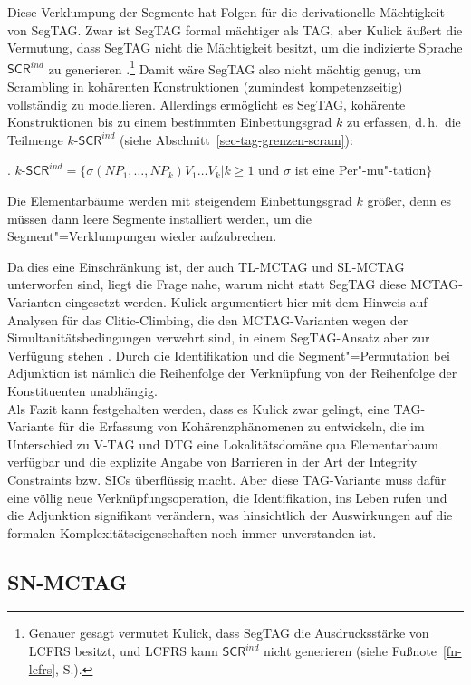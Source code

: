 Diese Verklumpung der Segmente hat Folgen für die derivationelle Mächtigkeit von SegTAG. Zwar ist SegTAG formal mächtiger als TAG, aber Kulick äu\ss ert die Vermutung, dass SegTAG nicht die Mächtigkeit besitzt, um die indizierte Sprache $\mathsf{SCR}^{ind}$ zu generieren \cite[215]{Kulick:00}.\footnote{Genauer gesagt vermutet Kulick, dass SegTAG die Ausdrucksstärke von LCFRS besitzt, und LCFRS kann $\mathsf{SCR}^{ind}$ nicht generieren (siehe Fußnote~\ref{fn-lcfrs}, S.\pageref{fn-lcfrs}).} Damit wäre SegTAG also nicht mächtig genug, um Scrambling in kohärenten Konstruktionen (zumindest kompetenzseitig) vollständig zu modellieren. Allerdings ermöglicht es SegTAG, kohärente Konstruktionen bis zu einem bestimmten Einbettungsgrad $k$ zu erfassen, d.\,h.\ die Teilmenge $k$-$\mathsf{SCR}^{ind}$ (siehe Abschnitt~\ref{sec-tag-grenzen-scram}):

\ex. $k$-$\mathsf{SCR}^{ind} = \{ \sigma(\mathit{NP}_1,\ldots,\mathit{NP}_k) V_1 \ldots V_k | k \geq 1$ und $\sigma$ ist eine Per"-mu"-tation$\}$

Die Elementarbäume werden mit steigendem Einbettungsgrad $k$ grö\ss er, denn es müssen dann leere Segmente installiert werden, um die Segment"=Verklumpungen wieder aufzubrechen. 

Da dies eine Einschränkung ist, der auch TL-MCTAG und SL-MCTAG unterworfen sind, liegt die Frage nahe, warum nicht statt SegTAG diese MCTAG-Varianten eingesetzt werden. Kulick argumentiert hier mit dem Hinweis auf Analysen für das Clitic-Climbing, die den MCTAG-Varianten wegen der Simultanitätsbedingungen verwehrt sind, in einem SegTAG-Ansatz aber zur Verfügung stehen \cite[53ff]{Kulick:00}. Durch die Identifikation und die Segment"=Permutation bei Adjunktion ist nämlich die Reihenfolge der Verknüpfung von der Reihenfolge der Konstituenten unabhängig.  \\     

Als Fazit kann festgehalten werden, dass es Kulick zwar gelingt, eine TAG-Variante für die Erfassung von Kohärenzphänomenen zu entwickeln, die im Unterschied zu V-TAG und DTG eine Lokalitätsdomäne qua Elementarbaum verfügbar und die explizite Angabe von Barrieren in der Art der Integrity Constraints bzw. SICs überflüssig macht. Aber diese TAG-Variante muss dafür eine völlig neue Verknüpfungsoperation, die Identifikation, ins Leben rufen und die Adjunktion signifikant verändern, was hinsichtlich der Auswirkungen auf die formalen Komplexitätseigenschaften  noch immer unverstanden ist. 


\subsection{SN-MCTAG}  \label{sec-snmctag}

